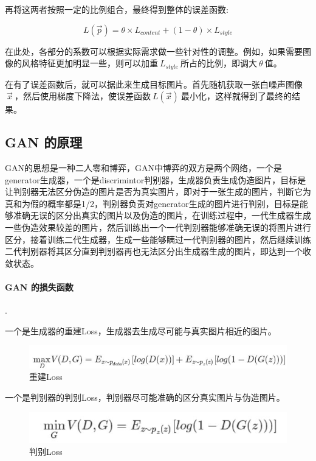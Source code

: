 \documentclass[conference]{IEEEtran}
\begin{document}
再将这两者按照一定的比例组合，最终得到整体的误差函数:

$$L(\vec{p})=\theta \times L_{content} + (1-\theta) \times L_{style}$$

在此处，各部分的系数可以根据实际需求做一些针对性的调整。例如，如果需要图像的风格特征更加明显一些，则可以加重$~L_{style}~$所占的比例，即调大$~\theta~$值。

在有了误差函数后，就可以据此来生成目标图片。首先随机获取一张白噪声图像$~\vec{x}~$，然后使用梯度下降法，使误差函数$~L(\vec{x})~$最小化，这样就得到了最终的结果。

\subsection{GAN 的原理}
GAN的思想是一种二人零和博弈，GAN中博弈的双方是两个网络，一个是generator生成器，一个是discrimintor判别器，生成器负责生成伪造图片，目标是让判别器无法区分伪造的图片是否为真实图片，即对于一张生成的图片，判断它为真和为假的概率都是1/2，判别器负责对generator生成的图片进行判别，目标是能够准确无误的区分出真实的图片以及伪造的图片，在训练过程中，一代生成器生成一些伪造效果较差的图片，然后训练出一个一代判别器能够准确无误的将图片进行区分，接着训练二代生成器，生成一些能够瞒过一代判别器的图片，然后继续训练二代判别器将其区分直到判别器再也无法区分出生成器生成的图片，即达到一个收敛状态。

\paragraph{GAN 的损失函数}.

一个是生成器的重建Loss，生成器去生成尽可能与真实图片相近的图片。
\begin{figure}[H]
	\centering
	\includegraphics[scale=0.5]{img/p2.jpg}
	\caption{重建Loss}
\end{figure}

一个是判别器的判别Loss，判别器尽可能准确的区分真实图片与伪造图片。
\begin{figure}[H]
	\centering
	\includegraphics[scale=0.5]{img/p3.jpg}
	\caption{判别Loss}
\end{figure}
\end{document}
